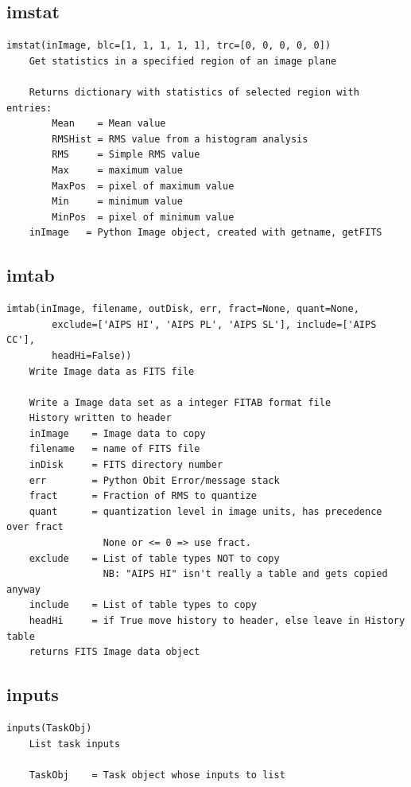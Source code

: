 \documentclass[11pt]{report}
\begin{document}
\subsection{imstat}
\begin{verbatim}
imstat(inImage, blc=[1, 1, 1, 1, 1], trc=[0, 0, 0, 0, 0])
    Get statistics in a specified region of an image plane
    
    Returns dictionary with statistics of selected region with entries:
        Mean    = Mean value
        RMSHist = RMS value from a histogram analysis
        RMS     = Simple RMS value
        Max     = maximum value
        MaxPos  = pixel of maximum value
        Min     = minimum value
        MinPos  = pixel of minimum value
    inImage   = Python Image object, created with getname, getFITS
\end{verbatim}

\subsection{imtab}
\begin{verbatim}
imtab(inImage, filename, outDisk, err, fract=None, quant=None, 
        exclude=['AIPS HI', 'AIPS PL', 'AIPS SL'], include=['AIPS CC'],
        headHi=False))
    Write Image data as FITS file
    
    Write a Image data set as a integer FITAB format file
    History written to header
    inImage    = Image data to copy
    filename   = name of FITS file
    inDisk     = FITS directory number
    err        = Python Obit Error/message stack
    fract      = Fraction of RMS to quantize
    quant      = quantization level in image units, has precedence over fract
                 None or <= 0 => use fract.
    exclude    = List of table types NOT to copy
                 NB: "AIPS HI" isn't really a table and gets copied anyway
    include    = List of table types to copy
    headHi     = if True move history to header, else leave in History table
    returns FITS Image data object
\end{verbatim}

\subsection{inputs}
\begin{verbatim}
inputs(TaskObj)
    List task inputs
    
    TaskObj    = Task object whose inputs to list
\end{verbatim}
\end{document}
